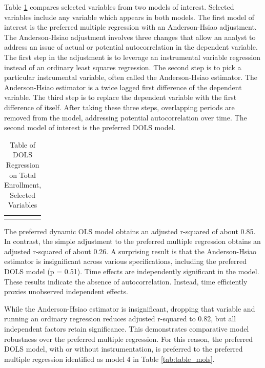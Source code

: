 \documentclass[review]{elsarticle}
\begin{document}
Table \ref{tab:table_dols} compares selected variables from two models of interest.
Selected variables include any variable which appears in both models.
The first model of interest is the preferred multiple regression with an Anderson-Hsiao adjustment.
The Anderson-Hsiao adjustment involves three changes that allow an analyst to address an issue of actual or potential autocorrelation in the dependent variable.
The first step in the adjustment is to leverage an instrumental variable regression instead of an ordinary least squares regression.
The second step is to pick a particular instrumental variable, often called the Anderson-Hsiao estimator.
The Anderson-Hsiao estimator is a twice lagged first difference of the dependent variable.
The third step is to replace the dependent variable with the first difference of itself.
After taking these three steps, overlapping periods are removed from the model, addressing potential autocorrelation over time.
The second model of interest is the preferred DOLS model.

\begin{table}
    \caption{Table of DOLS Regression on Total Enrollment, Selected Variables}
    \begin{tabularx}{\textwidth}{X}
        \centering
        
    \end{tabularx}
    \label{tab:table_dols}
\end{table}

The preferred dynamic OLS model obtains an adjusted r-squared of about 0.85.
In contrast, the simple adjustment to the preferred multiple regression
obtains an adjusted r-squared of about 0.26.
A surprising result is that the Anderson-Hsiao estimator is insignificant
across various specifications, including the preferred DOLS model (p = 0.51).
Time effects are independently significant in the model.
These results indicate the absence of autocorrelation.
Instead, time efficiently proxies unobserved independent effects.

While the Anderson-Hsiao estimator is insignificant,
dropping that variable and running an ordinary regression reduces adjusted r-squared to 0.82,
but all independent factors retain significance.
This demonstrates comparative model robustness over the preferred multiple regression.
For this reason, the preferred DOLS model, with or without instrumentation,
is preferred to the preferred multiple regression identified as
model 4 in Table \ref{tab:table_mols}.
\end{document}

